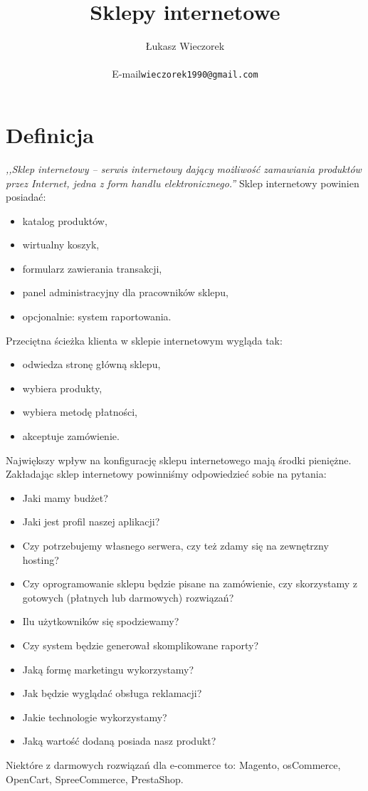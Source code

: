 \documentclass{report}
\title{
	Sklepy internetowe
}
\author{
	Łukasz Wieczorek\\
	\begin{tabular}{rl}
	E-mail & \texttt{wieczorek1990@gmail.com}\\
	\end{tabular}
}
\begin{document}
\maketitle
\section{Definicja}
\emph{,,Sklep internetowy -- serwis internetowy dający możliwość zamawiania produktów przez Internet, jedna z form handlu elektronicznego.''}\cite{wiki:sklep}
Sklep internetowy powinien posiadać:
\begin{itemize}
\item katalog produktów,
\item wirtualny koszyk,
\item formularz zawierania transakcji,
\item panel administracyjny dla pracowników sklepu,
\item opcjonalnie: system raportowania.
\end{itemize}
Przeciętna ścieżka klienta w sklepie internetowym wygląda tak:
\begin{itemize}
\item odwiedza stronę główną sklepu,
\item wybiera produkty,
\item wybiera metodę płatności,
\item akceptuje zamówienie.
\end{itemize}
Największy wpływ na konfigurację sklepu internetowego mają środki pieniężne. Zakładając sklep internetowy powinniśmy odpowiedzieć sobie na pytania:
\begin{itemize}
\item Jaki mamy budżet?
\item Jaki jest profil naszej aplikacji?
\item Czy potrzebujemy własnego serwera, czy też zdamy się na zewnętrzny hosting?
\item Czy oprogramowanie sklepu będzie pisane na zamówienie, czy skorzystamy z gotowych (płatnych lub darmowych) rozwiązań?
\item Ilu użytkowników się spodziewamy?
\item Czy system będzie generował skomplikowane raporty?
\item Jaką formę marketingu wykorzystamy?
\item Jak będzie wyglądać obsługa reklamacji?
\item Jakie technologie wykorzystamy?
\item Jaką wartość dodaną posiada nasz produkt?
\end{itemize}
Niektóre z darmowych rozwiązań dla e-commerce to: Magento, osCommerce, OpenCart, SpreeCommerce, PrestaShop.
\end{document}
